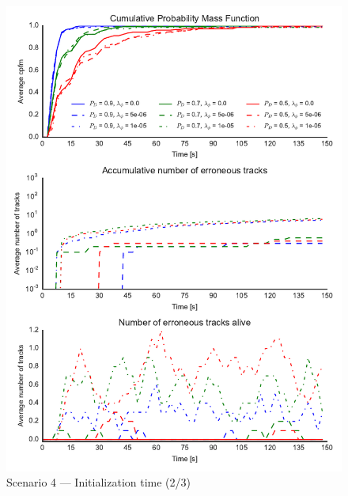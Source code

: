 \begin{figure}
\centering
\includegraphics{Figures/plots/Scenario4_Init-Time(2-3).pdf}
\caption{Scenario 4 --- Initialization time (2/3)}\label{fig:init4_time_2-3}
\end{figure}

